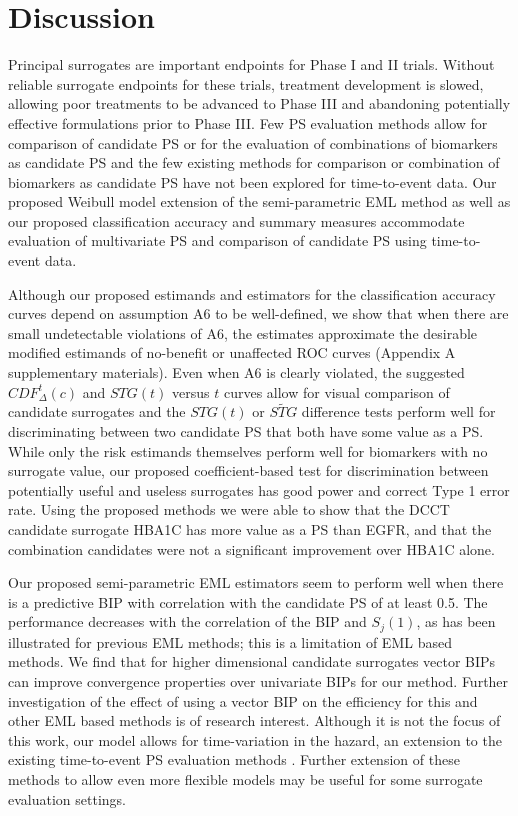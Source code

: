 \documentclass[times, doublespace]{simauth}
\begin{document}
\section{Discussion}
Principal surrogates are important endpoints for Phase I and II trials. Without reliable surrogate endpoints for these trials, treatment development is slowed, allowing poor treatments to be advanced to Phase III and abandoning potentially effective formulations prior to Phase III. Few PS evaluation methods allow for comparison of candidate PS or for the evaluation of combinations of biomarkers as candidate PS and the few existing methods for comparison or combination of biomarkers as candidate PS have not been explored for time-to-event data. Our proposed Weibull model extension of the \citet{Huang11} semi-parametric EML method as well as our proposed classification accuracy and summary measures accommodate evaluation of multivariate PS and comparison of candidate PS using time-to-event data. 

Although our proposed estimands and estimators for the classification accuracy curves depend on assumption A6 to be well-defined, we show that when there are small undetectable violations of A6, the estimates approximate the desirable modified estimands of no-benefit or unaffected ROC curves (Appendix A supplementary materials). Even when A6 is clearly violated, the suggested $CDF^{t}_{\Delta}(c)$ and $STG(t)$ versus $t$ curves allow for visual comparison of candidate surrogates and the $STG(t)$ or $\widetilde{STG}$ difference tests perform well for discriminating between two candidate PS that both have some value as a PS. While only the risk estimands themselves perform well for biomarkers with no surrogate value, our proposed coefficient-based test for discrimination between potentially useful and useless surrogates has good power and correct Type 1 error rate. Using the proposed methods we were able to show that the DCCT candidate surrogate HBA1C has more value as a PS than EGFR, and that the combination candidates were not a significant improvement over HBA1C alone.

Our proposed semi-parametric EML estimators seem to perform well when there is a predictive BIP with correlation with the candidate PS of at least 0.5. The performance decreases with the correlation of the BIP and $S_j(1)$, as has been illustrated for previous EML methods; this is a limitation of EML based methods. We find that for higher dimensional candidate surrogates vector BIPs can improve convergence properties over univariate BIPs for our method. Further investigation of the effect of using a vector BIP on the efficiency for this and other EML based methods is of research interest. Although it is not the focus of this work, our model allows for time-variation in the hazard, an extension to the existing time-to-event PS evaluation methods \citep{Qin07, Miao13}. Further extension of these methods to allow even more flexible models may be useful for some surrogate evaluation settings. 




%

\end{document}
